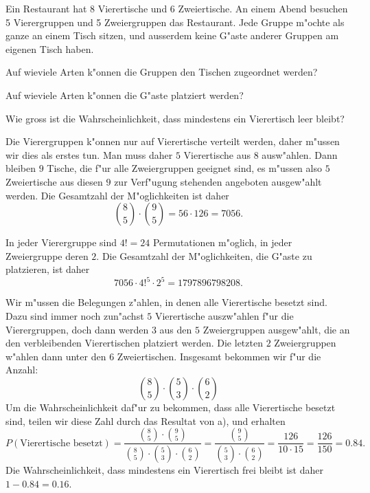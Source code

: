 Ein Restaurant hat 8 Vierertische und 6 Zweiertische.
An einem Abend besuchen 5 Vierergruppen und 5 Zweiergruppen das Restaurant.
Jede Gruppe m"ochte als ganze an einem Tisch sitzen, und ausserdem
keine G"aste anderer Gruppen am eigenen Tisch haben.
\begin{teilaufgaben}
\item Auf wieviele Arten k"onnen die Gruppen den Tischen zugeordnet
werden?
\item Auf wieviele Arten k"onnen die G"aste platziert werden?
\item Wie gross ist die Wahrscheinlichkeit, dass mindestens ein Vierertisch
leer bleibt?
\end{teilaufgaben}

\begin{loesung}
\begin{teilaufgaben}
\item
Die Vierergruppen k"onnen nur auf Vierertische verteilt werden,
daher m"ussen wir dies als erstes tun.
Man muss daher $5$ Vierertische aus $8$ ausw"ahlen.
Dann bleiben $9$ Tische, die f"ur alle Zweiergruppen geeignet sind,
es m"ussen also $5$ Zweiertische aus diesen $9$ zur Verf"ugung stehenden
angeboten ausgew"ahlt werden. 
Die Gesamtzahl der M"oglichkeiten ist daher
\[
\binom{8}{5}\cdot\binom{9}{5}=
56\cdot 126=7056.
\]
\item
In jeder Vierergruppe sind $4!=24$ Permutationen m"oglich, in jeder
Zweiergruppe deren $2$.
Die Gesamtzahl der M"oglichkeiten, die G"aste zu platzieren, ist daher
\[
7056\cdot 4!^5 \cdot 2^5=1797896798208.
\]
\item
Wir m"ussen die Belegungen z"ahlen, in denen alle Vierertische
besetzt sind. 
Dazu sind immer noch zun"achst $5$ Vierertische auszw"ahlen f"ur
die Vierergruppen, doch dann werden $3$ aus den $5$ Zweiergruppen ausgew"ahlt,
die an den verbleibenden Vierertischen platziert werden.
Die letzten $2$ Zweiergruppen w"ahlen dann unter den $6$ Zweiertischen.
Insgesamt bekommen wir f"ur die Anzahl:
\[
\binom{8}{5}\cdot \binom{5}{3}\cdot \binom{6}{2}
\]
Um die Wahrscheinlichkeit daf"ur zu bekommen, dass alle Vierertische
besetzt sind, teilen wir diese Zahl durch das Resultat von a), und
erhalten
\[
P(\text{Vierertische besetzt})
=
\frac{\binom{8}{5}\cdot\binom{9}{5}}{
\binom{8}{5}\cdot \binom{5}{3}\cdot \binom{6}{2}}
=
\frac{\binom{9}{5}}{\binom{5}{3}\cdot \binom{6}{2}}
=
\frac{126}{10\cdot 15}=\frac{126}{150}=0.84.
\]
Die Wahrscheinlichkeit, dass mindestens ein Vierertisch frei bleibt ist
daher $1-0.84=0.16$.
\qedhere
\end{teilaufgaben}
\end{loesung}

\begin{bewertung}
\end{bewertung}



